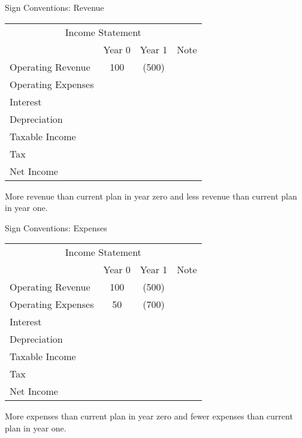 \documentclass[ignorenonframetext,]{beamer}
\begin{document}
\begin{frame}{Sign Conventions: Revenue}

\begin{table}[h]
\begin{tabular}{l||c|c||p{3cm}}
\multicolumn{4}{c}{Income Statement}\\
  &Year 0  &Year 1  &Note\\
\hline
        Operating Revenue   &   100 & (500) &\\
        Operating Expenses  &   &   &\\
        Interest    &   &   &\\
        Depreciation    &   &   &\\
        \hline
        Taxable Income  &   &   &\\
        Tax &   &   &\\
        \hline
        Net Income  &   &   &\\
\end{tabular}
\end{table}

More revenue than current plan in year zero and less revenue than
current plan in year one.

\end{frame}

\begin{frame}{Sign Conventions: Expenses}

\begin{table}[h]
\begin{tabular}{l||c|c||p{3cm}}
\multicolumn{4}{c}{Income Statement}\\
  &Year 0  &Year 1  &Note\\
\hline
        Operating Revenue   &   100 & (500) &\\
        Operating Expenses  &   50& (700)   &\\
        Interest    &   &   &\\
        Depreciation    &   &   &\\
        \hline
        Taxable Income  &   &   &\\
        Tax &   &   &\\
        \hline
        Net Income  &   &   &\\
\end{tabular}
\end{table}

More expenses than current plan in year zero and fewer expenses than
current plan in year one.

\end{frame}
\end{document}
